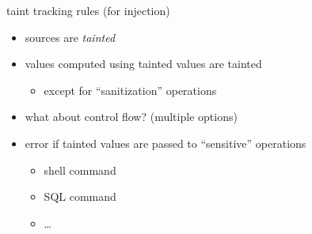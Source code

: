 \begin{frame}{taint tracking rules (for injection)}
    \begin{itemize}
        \item sources are \textit{tainted}
        \item {} values computed using tainted values are tainted
            \begin{itemize}
            \item except for  ``sanitization'' operations
            \end{itemize}
        \item what about control flow? (multiple options)
        \item error if tainted values are passed to ``sensitive'' operations
            \begin{itemize}
            \item shell command
            \item SQL command
            \item \ldots
            \end{itemize}
    \end{itemize}
\end{frame}
